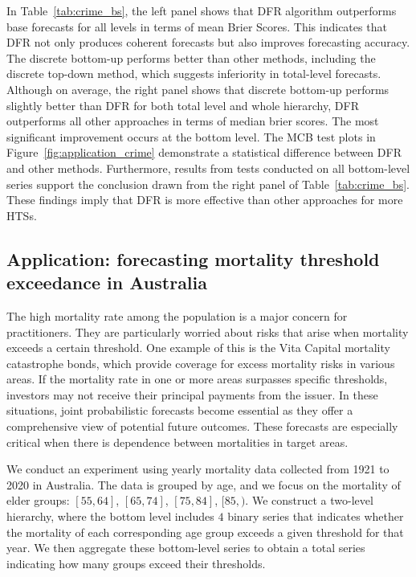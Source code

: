 \documentclass[a4paper,review,12pt,authoryear]{elsarticle}
\begin{document}
     
     In Table~\ref{tab:crime_bs}, the left panel shows that DFR algorithm outperforms base forecasts for all levels in terms of mean Brier Scores. This indicates that DFR not only produces coherent forecasts but also improves forecasting accuracy.
     The discrete bottom-up performs better than other methods, including the discrete top-down method, which suggests inferiority in total-level forecasts. 
     Although on average, the right panel shows that discrete bottom-up performs slightly better than DFR for both total level and whole hierarchy, DFR outperforms all other approaches in terms of median brier scores.
     The most significant improvement occurs at the bottom level.
     The MCB test plots in Figure~\ref{fig:application_crime} demonstrate a statistical difference between DFR and other methods.
     Furthermore, results from tests conducted on all bottom-level series support the conclusion drawn from the right panel of Table~\ref{tab:crime_bs}.
     These findings imply that DFR is more effective than other approaches for more HTSs. 
     
     \subsection{Application: forecasting mortality threshold exceedance in Australia}
     \label{sec:application_mortality}
     The high mortality rate among the population is a major concern for practitioners. 
     They are particularly worried about risks that arise when mortality exceeds a certain threshold. 
     One example of this is the Vita Capital mortality catastrophe bonds, which provide coverage for excess mortality risks in various areas. 
     If the mortality rate in one or more areas surpasses specific thresholds, investors may not receive their principal payments from the issuer.
     In these situations, joint probabilistic forecasts become essential as they offer a comprehensive view of potential future outcomes. 
     These forecasts are especially critical when there is dependence between mortalities in target areas.
     
     We conduct an experiment using yearly mortality data collected from 1921 to 2020 in Australia.
     The data is grouped by age, and we focus on the mortality of elder groups: $[55, 64]$, $[65, 74]$, $[75, 84]$, $[85, )$. 
     We construct a two-level hierarchy, where the bottom level includes 
     $4$ binary series that indicates whether the mortality of each corresponding age group exceeds a given threshold for that year.
     We then aggregate these bottom-level series to obtain a total series indicating how many groups exceed their thresholds.
     
\end{document}
